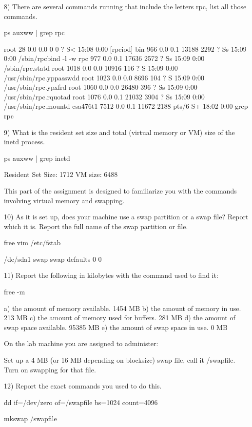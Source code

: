 8) There are several commands running that include the letters {\ltt{}rpc},
list all those commands.

ps auxww | grep rpc

root        28  0.0  0.0      0     0 ?        S<   15:08   0:00 [rpciod]
bin        966  0.0  0.1  13188  2292 ?        Ss   15:09   0:00 /sbin/rpcbind
-l -w
rpc        977  0.0  0.1  17636  2572 ?        Ss   15:09   0:00
/sbin/rpc.statd
root      1018  0.0  0.0  10916   116 ?        S    15:09   0:00
/usr/sbin/rpc.yppasswdd
root      1023  0.0  0.0   8696   104 ?        S    15:09   0:00
/usr/sbin/rpc.ypxfrd
root      1060  0.0  0.0  26480   396 ?        Ss   15:09   0:00
/usr/sbin/rpc.rquotad
root      1076  0.0  0.1  21032  3904 ?        Ss   15:09   0:00
/usr/sbin/rpc.mountd
csa476t1  7512  0.0  0.1  11672  2188 pts/6    S+   18:02   0:00 grep rpc

9) What is the resident set size and total (virtual memory or VM) size of the
{\ltt{}inetd} process.

ps auxww | grep inetd

Resident Set Size: 1712
VM size: 6488

This part of the assignment is designed to familiarize you with the
commands involving virtual memory and swapping.

10) As it is set up,
does your machine use a swap partition or a swap file? 
Report which it is.
Report the full name of the swap partition or file.

free
vim /etc/fstab

/de/sda1	swap	swap	defaults	0	0

11) Report the following in kilobytes with the
command used to find it:

free -m

a) the amount of memory available.
1454 MB
\break
b) the amount of memory in use.
 213 MB
\break
c) the amount of memory used for buffers.
281 MB
\break
d) the amount of swap space available.
 95385 MB
\break
e) the amount of swap space in use.
0 MB


On the lab machine you are assigned to administer:

Set up a 4 MB (or 16 MB depending on blocksize) swap file, 
call it {\ltt{}/swapfile}. Turn on swapping for that file.

12) Report the exact commands you used to do this.

dd if=/dev/zero of=/swapfile bs=1024 count=4096   

mkswap /swapfile

